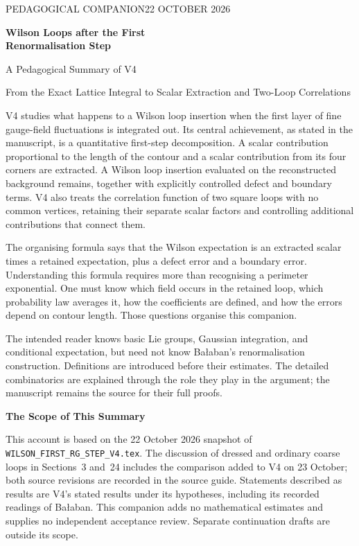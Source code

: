 \documentclass[11pt,a4paper]{article}
\newcommand{\subhead}[1]{\par\vspace{4pt}\textbf{\color{ink}#1}\par}
\begin{document}
\thispagestyle{empty}
{\small\color{muted}PEDAGOGICAL COMPANION\hfill 22 OCTOBER 2026\par}
\vspace{23pt}
{\Huge\bfseries\color{ink}Wilson Loops after the First\\[5pt]Renormalisation Step\par}
\vspace{13pt}
{\LARGE A Pedagogical Summary of V4\par}
\vspace{15pt}
{\large From the Exact Lattice Integral to Scalar Extraction and Two-Loop Correlations\par}
\vspace{23pt}

V4 studies what happens to a Wilson loop insertion when the first layer of fine gauge-field fluctuations is integrated out. Its central achievement, as stated in the manuscript, is a quantitative first-step decomposition. A scalar contribution proportional to the length of the contour and a scalar contribution from its four corners are extracted. A Wilson loop insertion evaluated on the reconstructed background remains, together with explicitly controlled defect and boundary terms. V4 also treats the correlation function of two square loops with no common vertices, retaining their separate scalar factors and controlling additional contributions that connect them.

The organising formula says that the Wilson expectation is an extracted scalar times a retained expectation, plus a defect error and a boundary error.
Understanding this formula requires more than recognising a perimeter exponential. One must know which field occurs in the retained loop, which probability law averages it, how the coefficients are defined, and how the errors depend on contour length. Those questions organise this companion.

The intended reader knows basic Lie groups, Gaussian integration, and conditional expectation, but need not know Ba{\l}aban's renormalisation construction. Definitions are introduced before their estimates. The detailed combinatorics are explained through the role they play in the argument; the manuscript remains the source for their full proofs.

\subhead{The Scope of This Summary}
This account is based on the 22 October 2026 snapshot of \texttt{WILSON\_FIRST\_RG\_STEP\_V4.tex}. The discussion of dressed and ordinary coarse loops in Sections~3 and~24 includes the comparison added to V4 on 23 October; both source revisions are recorded in the source guide. Statements described as results are V4's stated results under its hypotheses, including its recorded readings of Ba{\l}aban. This companion adds no mathematical estimates and supplies no independent acceptance review. Separate continuation drafts are outside its scope.
\end{document}
